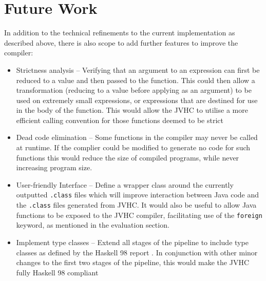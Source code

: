 \documentclass[float=false, crop=false]{standalone}
\begin{document}
\section{Future Work}

In addition to the technical refinements to the current implementation as described above, there is also scope to add further features to improve the compiler:


\begin{itemize}
  \item Strictness analysis -- Verifying that an argument to an
    expression can first be reduced to a value and then passed
    to the function. This could then allow a transformation 
    (reducing to a value before applying as an argument) to be used 
    on extremely small expressions, or expressions that are destined for use in the body of the function. This would allow the JVHC to utilise a more efficient calling convention for those functions deemed to be strict

  \item Dead code elimination -- Some functions in the compiler may never
    be called at runtime. 
    If the complier could be modified to generate no code for such functions this would
    reduce the size of compiled programs, while never
    increasing program size.

  \item User-friendly Interface -- Define a wrapper class
    around the currently outputted \verb|.class| files
    which will improve interaction between Java code and the
    \verb|.class| files generated from JVHC. It would also
    be useful to allow Java functions to be exposed to the JVHC 
    compiler, facilitating use of the \verb|foreign| keyword, 
    as mentioned in the evaluation section.

  \item Implement type classes -- Extend all stages of the pipeline to 
    include type classes as defined by the Haskell 98 report 
    \cite{haskell98-spec}. In conjunction with other minor changes to the first two stages of the pipeline,
    this would make the JVHC fully Haskell 98 compliant

\end{itemize}
\end{document}
